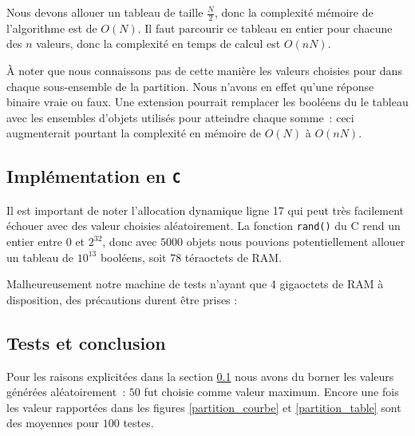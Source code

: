 Nous devons allouer un tableau de taille $\frac{N}{2}$, donc la
complexité mémoire de l'algorithme est de $O(N)$. Il faut parcourir ce
tableau en entier pour chacune des $n$ valeurs, donc la complexité en
temps de calcul est $O(nN)$.

À noter que nous connaissons pas de cette manière les valeurs choisies pour dans chaque sous-ensemble de la partition. Nous n'avons en effet qu'une réponse binaire vraie ou faux. Une extension pourrait remplacer les booléens du le tableau avec les ensembles d'objets utilisés pour atteindre chaque somme~: ceci augmenterait pourtant la complexité en mémoire de $O(N)$ à $O(nN)$.

\subsection{Implémentation en \texttt{C}}
\label{implementation_c}
Il est important de noter l'allocation dynamique ligne 17 qui peut
très facilement échouer avec des valeur choisies aléatoirement. La
fonction \texttt{rand()} du C rend un entier entre $0$ et $2^{32}$,
donc avec $5000$ objets nous pouvions potentiellement allouer un
tableau de $10^{13}$ booléens, soit 78 téraoctets de RAM.

Malheureusement notre machine de tests n'ayant que 4 gigaoctets de RAM
à disposition, des précautions durent être prises :

\vspace{0.5cm}

 

\subsection{Tests et conclusion}

Pour les raisons explicitées dans la section \ref{implementation_c}
nous avons du borner les valeurs générées aléatoirement~: $50$ fut
choisie comme valeur maximum. Encore une fois les valeur rapportées
dans les figures \ref{partition_courbe} et \ref{partition_table} sont
des moyennes pour $100$ testes.

